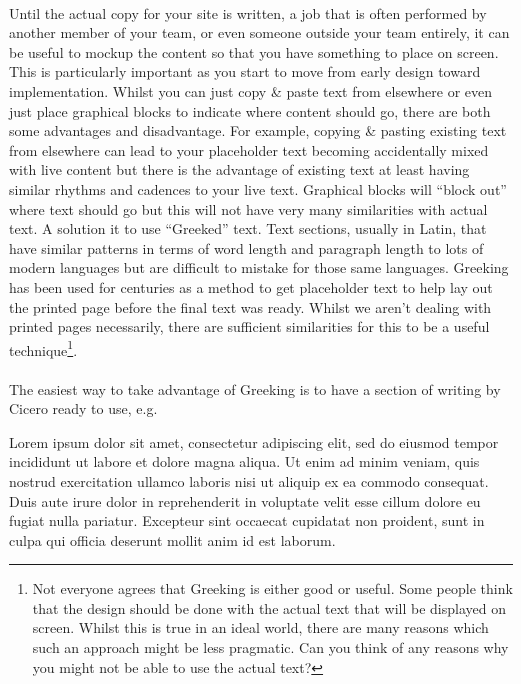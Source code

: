 \documentclass[10pt, a4paper]{article}
\begin{document}
\paragraph{} Until the actual copy for your site is written, a job that is often performed by another member of your team, or even someone outside your team entirely, it can be useful to mockup the content so that you have something to place on screen. This is particularly important as you start to move from early design toward implementation. Whilst you can just copy \& paste text from elsewhere or even just place graphical blocks to indicate where content should go, there are both some advantages and disadvantage. For example, copying \& pasting existing text from elsewhere can lead to your placeholder text becoming accidentally mixed with live content but there is the advantage of existing text at least having similar rhythms and cadences to your live text. Graphical blocks will ``block out'' where text should go but this will not have very many similarities with actual text. A solution it to use ``Greeked'' text. Text sections, usually in Latin, that have similar patterns in terms of word length and paragraph length to lots of modern languages but are difficult to mistake for those same languages. Greeking has been used for centuries as a method to get placeholder text to help lay out the printed page before the final text was ready. Whilst we aren't dealing with printed pages necessarily, there are sufficient similarities for this to be a useful technique\footnote{Not everyone agrees that Greeking is either good or useful. Some people think that the design should be done with the actual text that will be displayed on screen. Whilst this is true in an ideal world, there are many reasons which such an approach might be less pragmatic. Can you think of any reasons why you might not be able to use the actual text?}.

\paragraph{} The easiest way to take advantage of Greeking is to have a section of writing by Cicero ready to use, e.g. 

\begin{framed}
Lorem ipsum dolor sit amet, consectetur adipiscing elit, sed do eiusmod tempor incididunt ut labore et dolore magna aliqua. Ut enim ad minim veniam, quis nostrud exercitation ullamco laboris nisi ut aliquip ex ea commodo consequat. Duis aute irure dolor in reprehenderit in voluptate velit esse cillum dolore eu fugiat nulla pariatur. Excepteur sint occaecat cupidatat non proident, sunt in culpa qui officia deserunt mollit anim id est laborum.
\end{framed}
\end{document}
